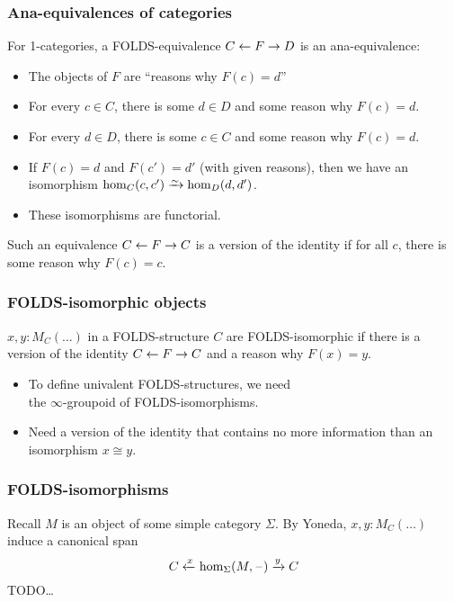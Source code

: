 \documentclass{beamer}
\newcommand{\blank}{\mathord{\hspace{1pt}\text{--}\hspace{1pt}}}
\begin{document}
\begin{frame}
  \frametitle{Ana-equivalences of categories}
  For 1-categories, a FOLDS-equivalence $C \leftarrow F \to D$ is an \alert<1>{ana-equivalence}:
  \begin{itemize}
  \item The objects of $F$ are ``reasons why $F(c) = d$''
  \item For every $c\in C$, there is some $d\in D$ and some reason why $F(c)=d$.
  \item For every $d\in D$, there is some $c\in C$ and some reason why $F(c)=d$.
  \item If $F(c)=d$ and $F(c')=d'$ (with given reasons), then we have an isomorphism $\hom_C(c,c') \toiso \hom_D(d,d')$.
  \item These isomorphisms are functorial.
  \end{itemize}
  \pause
  Such an equivalence $C \leftarrow F \to C$ is a \alert{version of the identity} if for all $c$, there is some reason why $F(c)=c$.
\end{frame}

\begin{frame}
  \frametitle{FOLDS-isomorphic objects}
  \begin{definition}
    $x,y:M_C(\dots)$ in a FOLDS-structure $C$ are \alert<1>{FOLDS-isomorphic} if there is a version of the identity $C\leftarrow F \to C$ and a reason why $F(x)=y$.
  \end{definition}
  \pause
  \begin{itemize}
  \item To define univalent FOLDS-structures, we need\\ \alert<2>{the $\infty$-groupoid of} FOLDS-isomorphisms.
    \pause
  \item Need a version of the identity that contains \alert<3>{no more information} than an isomorphism $x\cong y$.
  \end{itemize}
\end{frame}

\begin{frame}
  \frametitle{FOLDS-isomorphisms}
  Recall $M$ is an object of some simple category $\Sigma$.
  By Yoneda, $x,y:M_C(\dots)$ induce a canonical span
  \[ C \xot{x} \hom_\Sigma(M,\blank) \xto{y} C \]
  TODO\dots
\end{frame}
\end{document}
